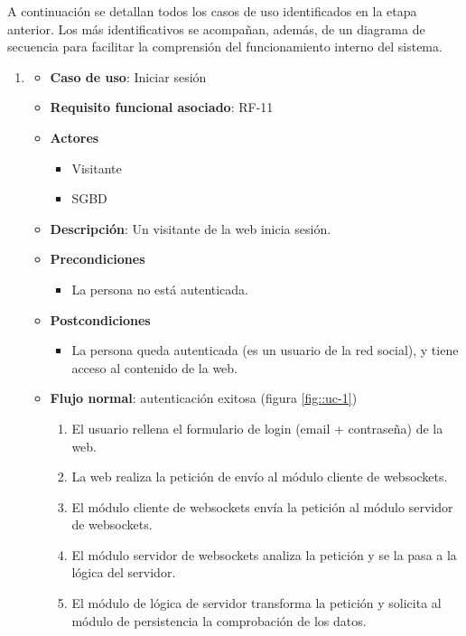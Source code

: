 A continuación se detallan todos los casos de uso identificados en la etapa anterior. Los más identificativos se acompañan, además, de un diagrama de secuencia para facilitar la comprensión del funcionamiento interno del sistema.

\renewcommand{\labelenumi}{\bf UC-\arabic{enumi}}
\renewcommand{\labelenumii}{\arabic{enumii}. }

\begin{enumerate}
\itemsep1cm
\item %
  \begin{itemize}
  \item \textbf{Caso de uso}: Iniciar sesión
  \item \textbf{Requisito funcional asociado}: RF-11
  \item \textbf{Actores}
    \begin{itemize}
    \item Visitante
    \item SGBD
    \end{itemize}
  \item \textbf{Descripción}: Un visitante de la web inicia sesión.
  \item \textbf{Precondiciones}
    \begin{itemize}
    \item La persona no está autenticada.
    \end{itemize}
  \item \textbf{Postcondiciones}
    \begin{itemize}
    \item La persona queda autenticada (es un usuario de la red social), y tiene acceso al contenido de la web.
    \end{itemize}
  \item \textbf{Flujo normal}: autenticación exitosa (figura \ref{fig::uc-1})
    \begin{enumerate}
    \item El usuario rellena el formulario de login (email + contraseña) de la web.
    \item La web realiza la petición de envío al módulo cliente de websockets.
    \item El módulo cliente de websockets envía la petición al módulo servidor de websockets.
    \item El módulo servidor de websockets analiza la petición y se la pasa a la lógica del servidor.
    \item El módulo de lógica de servidor transforma la petición y solicita al módulo de persistencia la comprobación de los datos.

\end{enumerate}
\end{itemize}
\end{enumerate}
